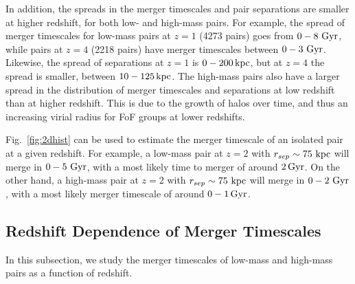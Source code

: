 \documentclass[twocolumn,linenumbers]{aastex631}
\begin{document}
    In addition, the spreads in the merger timescales and pair separations are smaller at higher redshift, for both low- and high-mass pairs. 
    For example, the spread of merger timescales for low-mass pairs at $z=1$ (4273 pairs) goes from $0-8\,\mathrm{\,Gyr}$, while pairs at $z=4$ (2218 pairs) have merger timescales between $0-3\,\mathrm{\,Gyr}$. 
    Likewise, the spread of separations at $z=1$ is $0-200\mathrm{\,kpc}$, but at $z=4$ the spread is smaller, between $10-125\mathrm{\,kpc}$. 
    The high-mass pairs also have a larger spread in the distribution of merger timescales and separations at low redshift than at higher redshift.
    This is due to the growth of halos over time, and thus an increasing virial radius for FoF groups at lower redshifts. 

    Fig.~\ref{fig:2dhist} can be used to estimate the merger timescale of an isolated pair at a given redshift. 
    For example, a low-mass pair at $z=2$ with $r_{sep}\sim 75\,\mathrm{\,kpc}$ will merge in $0-5\,\mathrm{\,Gyr}$, with a most likely time to merger of around $2\mathrm{\,Gyr}$.
    On the other hand, a high-mass pair at $z=2$ with $r_{sep}\sim 75\,\mathrm{\,kpc}$ will merge in $0-2\,\mathrm{\,Gyr}$, with a most likely merger timescale of around $0-1\mathrm{\,Gyr}$.
    
    
    
    
    
    
    
\subsection{Redshift Dependence of Merger Timescales}\label{sec:results-timevredshift}
    In this subsection, we study the merger timescales of low-mass and high-mass pairs as a function of redshift. 
    
\end{document}
